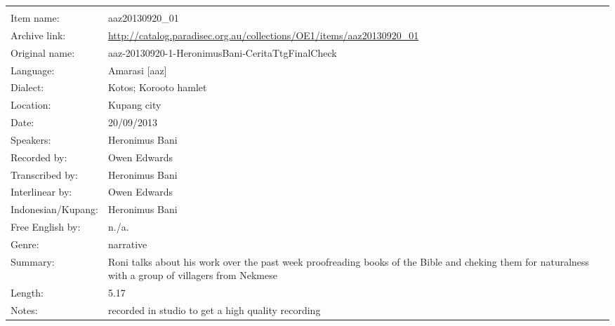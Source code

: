 \newpage
\noindent
\wg\begin{tabular}{lL{.67\textwidth}}
			& \\
Item name:			& aaz20130920{\_}01\\
Archive link:			& \url{http://catalog.paradisec.org.au/collections/OE1/items/aaz20130920_01}\\
Original name:			& {\small aaz-20130920-1-HeronimusBani-CeritaTtgFinalCheck}\\
Language:				& Amarasi [aaz] \\
Dialect:				& Kotos; Koro{\Q}oto hamlet \\
Location:				& Kupang city\\
Date:				& 20/09/2013\\
Speakers:				& Heronimus Bani\\
Recorded by:			& Owen Edwards\\
Transcribed by:		& Heronimus Bani\\
Interlinear by:		& Owen Edwards \\
Indonesian/Kupang:		& Heronimus Bani\\
Free English by:		& n./a.\\
Genre:				& narrative\\
Summary:				& Roni talks about his work over the past week proofreading books
						of the Bible and cheking them for naturalness
						with a group of villagers from Nekmese{\Q}\\
Length:				& 5.17\\
Notes:				& recorded in studio to get a high quality recording\\
\end{tabular}

